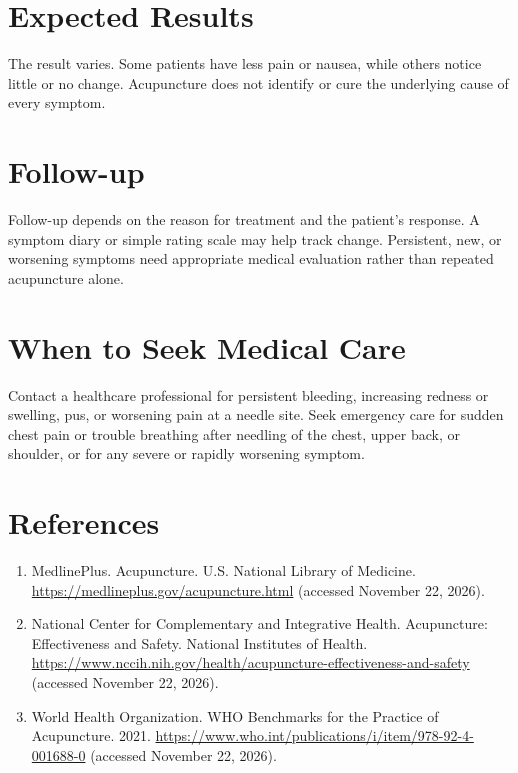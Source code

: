 \section*{Expected Results}
The result varies. Some patients have less pain or nausea, while others notice little or no change. Acupuncture does not identify or cure the underlying cause of every symptom.

\section*{Follow-up}
Follow-up depends on the reason for treatment and the patient's response. A symptom diary or simple rating scale may help track change. Persistent, new, or worsening symptoms need appropriate medical evaluation rather than repeated acupuncture alone.

\section*{When to Seek Medical Care}
Contact a healthcare professional for persistent bleeding, increasing redness or swelling, pus, or worsening pain at a needle site. Seek emergency care for sudden chest pain or trouble breathing after needling of the chest, upper back, or shoulder, or for any severe or rapidly worsening symptom.

\section*{References}
\begin{enumerate}
  \item MedlinePlus. Acupuncture. U.S. National Library of Medicine. \url{https://medlineplus.gov/acupuncture.html} (accessed November 22, 2026).
  \item National Center for Complementary and Integrative Health. Acupuncture: Effectiveness and Safety. National Institutes of Health. \url{https://www.nccih.nih.gov/health/acupuncture-effectiveness-and-safety} (accessed November 22, 2026).
  \item World Health Organization. WHO Benchmarks for the Practice of Acupuncture. 2021. \url{https://www.who.int/publications/i/item/978-92-4-001688-0} (accessed November 22, 2026).
\end{enumerate}

\clearpage
